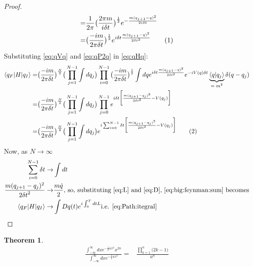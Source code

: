 \documentclass[]{article}
\newcommand\numberthis{\addtocounter{equation}{1}\tag{\theequation}}
\newtheorem{thm}{Theorem}
\begin{document}
\begin{proof}
\begin{align*}
	=& \frac{1}{2\pi} \big(\frac{2\pi m}{i \delta t}\big)^\frac{1}{2} e^{-\frac{m (q_{j+1}-q)^2}{2 i \delta t}}\\
	=& \big(\frac{-i m}{2\pi \delta t}\big)^\frac{1}{2} e^{i \delta t \frac{m (q_{j+1}-q)^2}{2  {\delta t}^2}}  \numberthis \label{eq:qP2q}
	\end{align*}
	Substituting \eqref{eq:qVq} and \eqref{eq:qP2q} in \eqref{eq:qHq}: 
	\begin{align*}
		\braket{q_F\vert H\vert q_I} =& \big(\frac{-i m}{2\pi \delta t}\big)^\frac{N}{2} \big(\prod_{j=1}^{N-1} \int dq_j\big) \prod_{i=0}^{N-1} \big(\frac{-i m}{2\pi \delta t}\big)^\frac{1}{2} \int dq e^{i \delta t \frac{m (q_{j+1}-q)^2}{2  {\delta t}^2}} e^{-i V(q) \delta t} \underbrace{\braket{ q \vert q_j}}_\text{$=m^2$}\delta(q-q_j) \\
		=& \big(\frac{-i m}{2\pi \delta t}\big)^\frac{N}{2} \big(\prod_{j=1}^{N-1} \int dq_j\big) \prod_{j=0}^{N-1}  e^{i \delta t \bigg[\frac{m (q_{j+1}-q_j)^2}{2  {\delta t}^2} - V(q_j)\bigg]}\\
		=& \big(\frac{-i m}{2\pi \delta t}\big)^\frac{N}{2} \big(\prod_{j=1}^{N-1} \int dq_j\big)  e^{i  \sum_{i=0}^{N-1} \delta t \bigg[\frac{m (q_{j+1}-q_j)^2}{2  {\delta t}^2} - V(q_j)\bigg]} \numberthis \label{eq:big:feynman:sum}
	\end{align*}
	Now, as $N\rightarrow\infty$
	\begin{align*}
	\sum_{i=0}^{N-1} \delta t \rightarrow &\int dt\\
	\frac{m (q_{j+1}-q_j)^2}{2  {\delta t}^2} \rightarrow & \frac{m \dot{q}}{2} \text{, so, substituting \eqref{eq:L} and \eqref{eq:D}, \eqref{eq:big:feynman:sum} becomes}\\
	\braket{q_F\vert H\vert q_I} \rightarrow& \int Dq(t) e^{i \int_{0}^{T}dt L} \text{i.e. \eqref{eq:Path:itegral}}
	\end{align*}
\end{proof}




\begin{thm}
	\begin{align*}
		\frac{\int_{-\infty}^\infty dx e^{-\frac{1}{2}ax^2}x^{2n}}{\int_{-\infty}^\infty dx e^{-\frac{1}{2}ax^2}} =&\frac{\prod_{k=1}^{n}\big(2k-1\big)}{a^n}
	\end{align*}
\end{thm}
\end{document}
